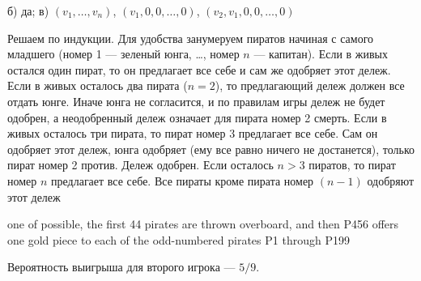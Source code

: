 \begin{solution}{5.25}
б) да; в) $(v_{1},\ldots, v_{n})$, $(v_{1},0,0,\ldots,0)$, $(v_{2},v_{1},0,0,\ldots,0)$
\end{solution}
\begin{solution}{5.26}

\end{solution}
\begin{solution}{5.27}

\end{solution}
\begin{solution}{5.28}

\end{solution}
\begin{solution}{5.29}

\end{solution}
\begin{solution}{6.1}
Решаем по индукции. Для удобства занумеруем пиратов начиная с самого младшего (номер 1 --- зеленый юнга, \ldots, номер $n$ --- капитан). Если в живых остался один пират, то он предлагает все себе и сам же одобряет этот дележ. Если в живых осталось два пирата ($n=2$), то предлагающий дележ должен все отдать юнге. Иначе юнга не согласится, и по правилам игры дележ не будет одобрен, а неодобренный дележ означает для пирата номер 2 смерть. Если в живых осталось три пирата, то пират номер 3 предлагает все себе. Сам он одобряет этот дележ, юнга одобряет (ему все равно ничего не достанется), только пират номер 2 против. Дележ одобрен. Если осталось $n>3$ пиратов, то пират номер $n$ предлагает все себе. Все пираты кроме пирата номер $(n-1)$ одобряют этот дележ
\end{solution}
\begin{solution}{6.2}

 one of possible, the first 44 pirates are thrown overboard, and then P456 offers
 one gold piece to each of the odd-numbered pirates P1 through P199
\end{solution}
\begin{solution}{6.3}

\end{solution}
\begin{solution}{6.4}
Вероятность выигрыша для второго игрока --- $5/9$.
\end{solution}
\begin{solution}{6.5}

\end{solution}
\begin{solution}{6.6}

\end{solution}
